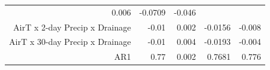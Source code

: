 \begin{longtable}[c]{@{}rrrrr@{}}
\begin{minipage}[t]{0.07\columnwidth}\raggedleft\strut
0.006
\strut\end{minipage} &
\begin{minipage}[t]{0.10\columnwidth}\raggedleft\strut
-0.0709
\strut\end{minipage} &
\begin{minipage}[t]{0.10\columnwidth}\raggedleft\strut
-0.046
\strut\end{minipage}\tabularnewline
\begin{minipage}[t]{0.37\columnwidth}\raggedleft\strut
AirT x 2-day Precip x Drainage
\strut\end{minipage} &
\begin{minipage}[t]{0.08\columnwidth}\raggedleft\strut
-0.01
\strut\end{minipage} &
\begin{minipage}[t]{0.07\columnwidth}\raggedleft\strut
0.002
\strut\end{minipage} &
\begin{minipage}[t]{0.10\columnwidth}\raggedleft\strut
-0.0156
\strut\end{minipage} &
\begin{minipage}[t]{0.10\columnwidth}\raggedleft\strut
-0.008
\strut\end{minipage}\tabularnewline
\begin{minipage}[t]{0.37\columnwidth}\raggedleft\strut
AirT x 30-day Precip x Drainage
\strut\end{minipage} &
\begin{minipage}[t]{0.08\columnwidth}\raggedleft\strut
-0.01
\strut\end{minipage} &
\begin{minipage}[t]{0.07\columnwidth}\raggedleft\strut
0.004
\strut\end{minipage} &
\begin{minipage}[t]{0.10\columnwidth}\raggedleft\strut
-0.0193
\strut\end{minipage} &
\begin{minipage}[t]{0.10\columnwidth}\raggedleft\strut
-0.004
\strut\end{minipage}\tabularnewline
\begin{minipage}[t]{0.37\columnwidth}\raggedleft\strut
AR1
\strut\end{minipage} &
\begin{minipage}[t]{0.08\columnwidth}\raggedleft\strut
0.77
\strut\end{minipage} &
\begin{minipage}[t]{0.07\columnwidth}\raggedleft\strut
0.002
\strut\end{minipage} &
\begin{minipage}[t]{0.10\columnwidth}\raggedleft\strut
0.7681
\strut\end{minipage} &
\begin{minipage}[t]{0.10\columnwidth}\raggedleft\strut
0.776
\strut\end{minipage}\tabularnewline
\bottomrule
\end{longtable}

